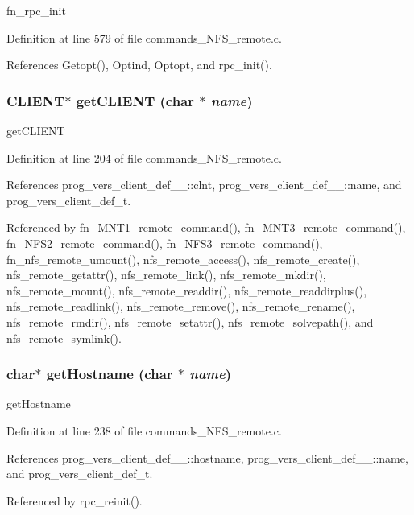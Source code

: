 fn\_\-rpc\_\-init 

Definition at line 579 of file commands\_\-NFS\_\-remote.c.

References Getopt(), Optind, Optopt, and rpc\_\-init().
\subsubsection{\setlength{\rightskip}{0pt plus 5cm}CLIENT$\ast$ get\-CLIENT (char $\ast$ {\em name})}\label{commands__NFS__remote_8c_a21}


get\-CLIENT 

Definition at line 204 of file commands\_\-NFS\_\-remote.c.

References prog\_\-vers\_\-client\_\-def\_\-\_\-::clnt, prog\_\-vers\_\-client\_\-def\_\-\_\-::name, and prog\_\-vers\_\-client\_\-def\_\-t.

Referenced by fn\_\-MNT1\_\-remote\_\-command(), fn\_\-MNT3\_\-remote\_\-command(), fn\_\-NFS2\_\-remote\_\-command(), fn\_\-NFS3\_\-remote\_\-command(), fn\_\-nfs\_\-remote\_\-umount(), nfs\_\-remote\_\-access(), nfs\_\-remote\_\-create(), nfs\_\-remote\_\-getattr(), nfs\_\-remote\_\-link(), nfs\_\-remote\_\-mkdir(), nfs\_\-remote\_\-mount(), nfs\_\-remote\_\-readdir(), nfs\_\-remote\_\-readdirplus(), nfs\_\-remote\_\-readlink(), nfs\_\-remote\_\-remove(), nfs\_\-remote\_\-rename(), nfs\_\-remote\_\-rmdir(), nfs\_\-remote\_\-setattr(), nfs\_\-remote\_\-solvepath(), and nfs\_\-remote\_\-symlink().
\subsubsection{\setlength{\rightskip}{0pt plus 5cm}char$\ast$ get\-Hostname (char $\ast$ {\em name})}\label{commands__NFS__remote_8c_a23}


get\-Hostname 

Definition at line 238 of file commands\_\-NFS\_\-remote.c.

References prog\_\-vers\_\-client\_\-def\_\-\_\-::hostname, prog\_\-vers\_\-client\_\-def\_\-\_\-::name, and prog\_\-vers\_\-client\_\-def\_\-t.

Referenced by rpc\_\-reinit().
